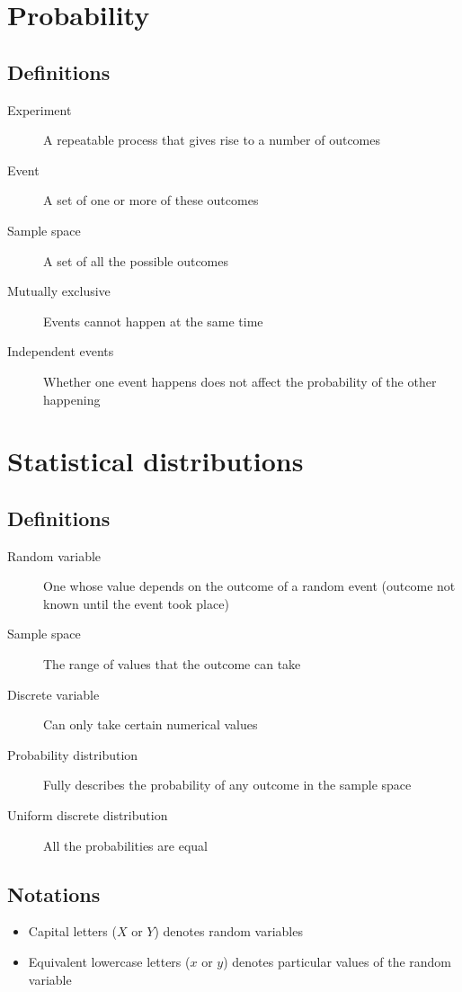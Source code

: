 \documentclass[fleqn, 11pt]{article}
\begin{document}
	\pagebreak
	
	
	\section{Probability}
	\subsection{Definitions}
	\begin{description}
		\item[Experiment] A repeatable process that gives rise to a number of outcomes
		\item[Event] A set of one or more of these outcomes
		\item[Sample space] A set of all the possible outcomes
		\item[Mutually exclusive] Events cannot happen at the same time
		\item[Independent events] Whether one event happens does not affect the probability of the other happening
	\end{description}
	
	\pagebreak
	
	
	
	\section{Statistical distributions}
	\subsection{Definitions}
	\begin{description}
		\item[Random variable] One whose value depends on the outcome of a random event (outcome not known until the event took place)
		\item[Sample space] The range of values that the outcome can take
		\item[Discrete variable] Can only take certain numerical values
		\item[Probability distribution] Fully describes the probability of any outcome in the sample space
		\item[Uniform discrete distribution] All the probabilities are equal
	\end{description}
	
	\subsection{Notations}
	\begin{itemize}
		\item Capital letters ($X$ or $Y$) denotes random variables
		\item Equivalent lowercase letters ($x$ or $y$) denotes particular values of the random variable
	\end{itemize}
	
\end{document}
